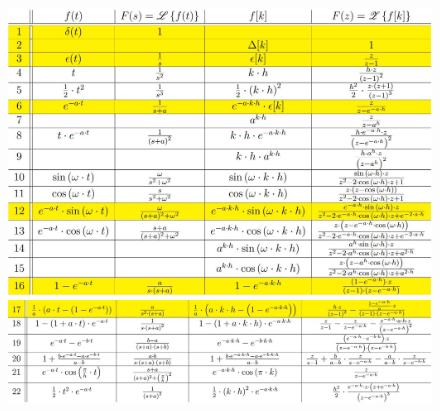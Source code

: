 
\begin{figure}[H]
    \includegraphics[width  = 1\textwidth]{img/Tranforme_en_Z.JPG}
    \includegraphics[width  = 1\textwidth]{img/Tranforme_en_Z2.JPG}
\end{figure}